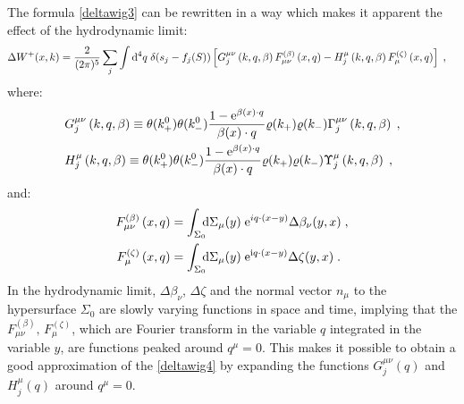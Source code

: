 \documentclass[prd,superscriptaddress,nofootinbib,notitlepage]{revtex4-1}
\newcommand{\e}{{\rm e}}
\newcommand{\di}{{\rm d}}
\newcommand{\ii}{{\rm i}}
\newcommand{\be}{\begin{equation}}
\newcommand{\ee}{\end{equation}}
\begin{document}
The formula \eqref{deltawig3} can be rewritten in a way which makes it apparent the effect of the hydrodynamic limit:
%
\be\label{deltawig4}
\begin{split}
    \Delta W^+(x,k) =\frac{2}{(2\pi)^5} \sum_{j} \int \di^4 q\;
    \delta (s_j - f_j(S))& \left[ G^{\mu\nu}_{j}\left(k,q,\beta\right) F^{(\beta)}_{\mu\nu}\left(x,q\right)-H_{j}^\mu\left(k,q,\beta\right)F^{(\zeta)}_{\mu}\left(x,q\right)\right]\;, 
\end{split}
\ee
%
where:
%
\begin{subequations}\label{Gfunct}
\begin{align}
    &   G_{j}^{\mu\nu}\left(k,q,\beta\right) \equiv \theta(k_+^0)\theta(k_-^0) \frac{1 - \e^{\beta(x)\cdot q}}{\beta(x) \cdot q }
 \varrho(k_+)\varrho(k_-)\Gamma_{j}^{\mu\nu}\left(k,q,\beta\right)\;, \\
&  H_{j}^{\mu}\left(k,q,\beta\right) \equiv \theta(k_+^0)\theta(k_-^0) \frac{1 -\e^{\beta(x)\cdot q}}{\beta(x) \cdot q}
 \varrho(k_+)\varrho(k_-) \Upsilon_{j}^{\mu}\left(k,q,\beta\right)\;,
\end{align}
\end{subequations}
%
and:
%
\begin{subequations}\label{Ffunct}
    \begin{align} F^{(\beta)}_{\mu\nu}\left(x,q\right) &= \int_{\Sigma_{0}} \!\!\! \di \Sigma_{\mu}(y) \; 
  \e^{iq\cdot(x-y)} \Delta \beta_\nu(y,x)\;, \\
 F^{(\zeta)}_{\mu}\left(x,q\right) &= \int_{\Sigma_{0}} \!\!\! \di \Sigma_{\mu}(y) \; 
  \e^{\ii q\cdot(x-y)} \Delta\zeta(y,x)\;.
    \end{align}
\end{subequations}
%
In the hydrodynamic limit, $\Delta\beta_{\nu}$, $\Delta\zeta$ and the normal vector $n_\mu$ to the hypersurface
$\Sigma_0$ are slowly varying functions in space and time, implying that the $F^{(\beta)}_{\mu\nu},\, F^{(\zeta)}_\mu$, which are Fourier 
transform in the variable $q$ integrated in the variable $y$, are functions peaked around $q^{\mu}=0$. This makes 
it possible to obtain a good approximation of the \eqref{deltawig4} by expanding the functions $G^{\mu\nu}_{j}(q)$ 
and $H_{j}^\mu(q)$ around $q^\mu=0$. 
\end{document}
